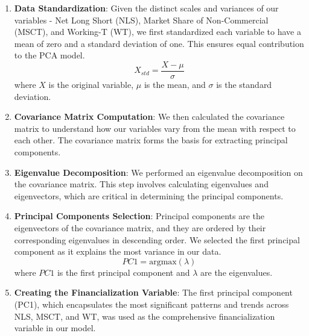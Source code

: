 \begin{enumerate}
    \item \textbf{Data Standardization}: Given the distinct scales and variances of our variables - Net Long Short (NLS), Market Share of Non-Commercial (MSCT), and Working-T (WT), we first standardized each variable to have a mean of zero and a standard deviation of one. This ensures equal contribution to the PCA model.
    \begin{equation}
        X_{std} = \frac{X - \mu}{\sigma}
    \end{equation}
    where \( X \) is the original variable, \( \mu \) is the mean, and \( \sigma \) is the standard deviation.

    \item \textbf{Covariance Matrix Computation}: We then calculated the covariance matrix to understand how our variables vary from the mean with respect to each other. The covariance matrix forms the basis for extracting principal components.
    
    \item \textbf{Eigenvalue Decomposition}: We performed an eigenvalue decomposition on the covariance matrix. This step involves calculating eigenvalues and eigenvectors, which are critical in determining the principal components.

    \item \textbf{Principal Components Selection}: Principal components are the eigenvectors of the covariance matrix, and they are ordered by their corresponding eigenvalues in descending order. We selected the first principal component as it explains the most variance in our data.
    \begin{equation}
        PC1 = \text{argmax}(\lambda)
    \end{equation}
    where \( PC1 \) is the first principal component and \( \lambda \) are the eigenvalues.

    \item \textbf{Creating the Financialization Variable}: The first principal component (PC1), which encapsulates the most significant patterns and trends across NLS, MSCT, and WT, was used as the comprehensive financialization variable in our model.
\end{enumerate}